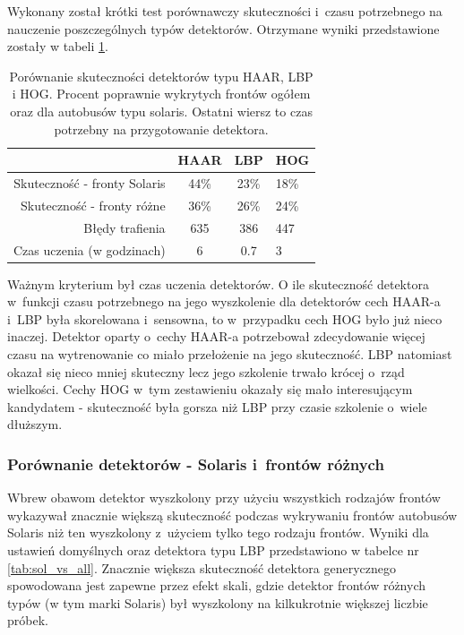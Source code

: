 Wykonany został
krótki test porównawczy skuteczności i~czasu potrzebnego na nauczenie
poszczególnych typów detektorów. Otrzymane wyniki przedstawione 
zostały w tabeli \ref{tab:haar_lbp_hog_comparison}.

\begin{table}[!h]
\centering
\begin{tabular}{r|c|c|l}
             & HAAR     & LBP  & HOG  \\
    \hline
Skuteczność - fronty Solaris      & 44\%     & 23\% & 18\%  \\
Skuteczność - fronty różne        & 36\%     & 26\% & 24\%  \\
Błędy trafienia            & 635      & 386  & 447   \\
Czas uczenia (w godzinach) & 6 & 0.7 & 3  
\end{tabular}
\caption{Porównanie skuteczności detektorów typu HAAR, LBP i HOG.
Procent poprawnie wykrytych frontów ogółem oraz dla autobusów typu 
solaris. Ostatni wiersz to czas potrzebny na przygotowanie detektora.}
\label{tab:haar_lbp_hog_comparison}
\end{table}

Ważnym kryterium był czas uczenia detektorów.
O ile skuteczność detektora w~funkcji czasu potrzebnego na jego 
wyszkolenie dla detektorów cech HAAR-a i~LBP była skorelowana i~sensowna,
to w~przypadku cech HOG było już nieco inaczej.
Detektor oparty o~cechy HAAR-a potrzebował
zdecydowanie więcej czasu na wytrenowanie co miało przełożenie 
na jego skuteczność. LBP natomiast okazał się nieco mniej skuteczny
lecz jego szkolenie trwało krócej o~rząd wielkości.
Cechy HOG w~tym zestawieniu okazały się mało interesującym kandydatem
- skuteczność była gorsza niż LBP przy czasie szkolenie o~wiele dłuższym.

\subsubsection{Porównanie detektorów - Solaris i~frontów różnych}

Wbrew obawom detektor wyszkolony przy użyciu wszystkich 
rodzajów frontów 
wykazywał znacznie większą skuteczność podczas wykrywaniu 
frontów autobusów Solaris niż ten
wyszkolony z~użyciem tylko tego rodzaju frontów. Wyniki dla ustawień
domyślnych oraz detektora typu LBP przedstawiono w tabelce nr 
\ref{tab:sol_vs_all}. Znacznie większa skuteczność detektora
generycznego spowodowana jest zapewne przez efekt skali,
gdzie detektor frontów różnych typów (w tym marki Solaris) 
był wyszkolony na kilkukrotnie większej liczbie próbek.

